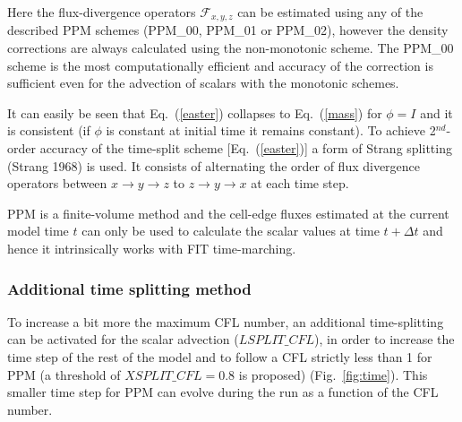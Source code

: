   Here the flux-divergence operators $\mathcal{F}_{x,y,z}$ can be
  estimated using any of the described PPM schemes (PPM\_00, PPM\_01 or
  PPM\_02), however the density corrections are always calculated using
  the non-monotonic scheme. The PPM\_00 scheme is the most computationally
  efficient and accuracy of the correction is sufficient even for the
  advection of scalars with the monotonic schemes. 

  It can easily be seen that Eq.~(\ref{easter}) collapses to Eq.~(\ref{mass}) for
  $\phi = I$ and it is consistent (if $\phi$ is constant at initial time
  it remains constant). To achieve 2$^{nd}$-order accuracy of the
  time-split scheme [Eq.~(\ref{easter})] a form of Strang splitting (Strang
  1968) is used. It consists of alternating the order of flux divergence
  operators between $x \rightarrow y \rightarrow z$ to $z \rightarrow y
  \rightarrow x$ at each time step.

  PPM is a finite-volume method and the cell-edge fluxes estimated at
  the current model time $t$ can only be used to calculate the scalar
  values at time $t+\Delta t$ and hence it intrinsically works with
  FIT time-marching. 
  
    \subsubsection{Additional time splitting method}

To increase a bit more the maximum CFL number, an additional time-splitting can be activated  for the scalar advection ($LSPLIT\_CFL$), in order to increase the time step of the rest of the model and to follow a CFL strictly less than 1 for PPM (a threshold of $XSPLIT\_CFL=0.8$ is proposed) (Fig.~\ref{fig:time}). This smaller time step for PPM can evolve during the run as a function of the CFL number.





